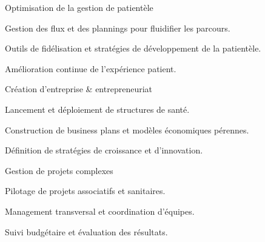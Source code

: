 
\begin{cventries}
  \cventry
    {}
    {Optimisation de la gestion de patientèle}
    {}
    {}
    {
      \begin{cvitems}
        \item Gestion des flux et des plannings pour fluidifier les parcours.
        \item Outils de fidélisation et stratégies de développement de la patientèle.
        \item Amélioration continue de l'expérience patient.
      \end{cvitems}
    }

  \cventry
    {}
    {Création d'entreprise \& entrepreneuriat}
    {}
    {}
    {
      \begin{cvitems}
        \item Lancement et déploiement de structures de santé.
        \item Construction de business plans et modèles économiques pérennes.
        \item Définition de stratégies de croissance et d'innovation.
      \end{cvitems}
    }

  \cventry
    {}
    {Gestion de projets complexes}
    {}
    {}
    {
      \begin{cvitems}
        \item Pilotage de projets associatifs et sanitaires.
        \item Management transversal et coordination d'équipes.
        \item Suivi budgétaire et évaluation des résultats.
      \end{cvitems}
    }
\end{cventries}


\begin{cvskills}
\end{cvskills}


